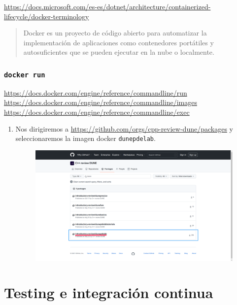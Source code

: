 \url{https://docs.microsoft.com/es-es/dotnet/architecture/containerized-lifecycle/docker-terminology}

\begin{quote}
	Docker es un proyecto de código abierto para automatizar la implementación de aplicaciones como contenedores portátiles y autosuficientes que se pueden ejecutar en la nube o localmente.
\end{quote}

\subsubsection{\texttt{docker run}}

\url{https://docs.docker.com/engine/reference/commandline/run}
\url{https://docs.docker.com/engine/reference/commandline/images}
\url{https://docs.docker.com/engine/reference/commandline/exec}


\begin{enumerate}
	\item Nos dirigiremos a \url{https://github.com/orgs/cpp-review-dune/packages} y seleccionaremos la imagen docker \texttt{dunepdelab}.
	      \begin{figure}[ht!]
		      \centering
		      \includegraphics[width=.6\paperwidth]{images/imagedunepdelab}
	      \end{figure}
\end{enumerate}

\section{Testing e integración continua} %

